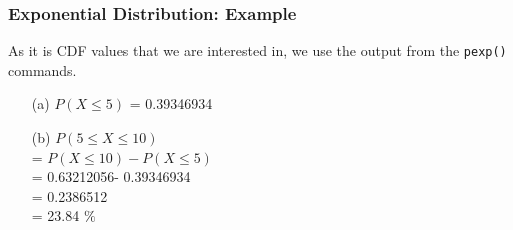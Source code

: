 \documentclass[a4]{beamer}
\begin{document}
\begin{frame}[fragile]
\frametitle{Exponential Distribution: Example}

As it is CDF values that we are interested in, we use the output from the \texttt{pexp()} commands.

\begin{itemize}
\item[(a)] $P(X \leq 5)$ = 0.39346934 
\item[(b)] $P(5 \leq X \leq 10)$ \\ = $P( X \leq 10) - P( X \leq 5)$ \\ = 0.63212056- 0.39346934 \\ = 0.2386512 \\= 23.84 $\%$
\end{itemize}

\end{frame}
\end{document}
